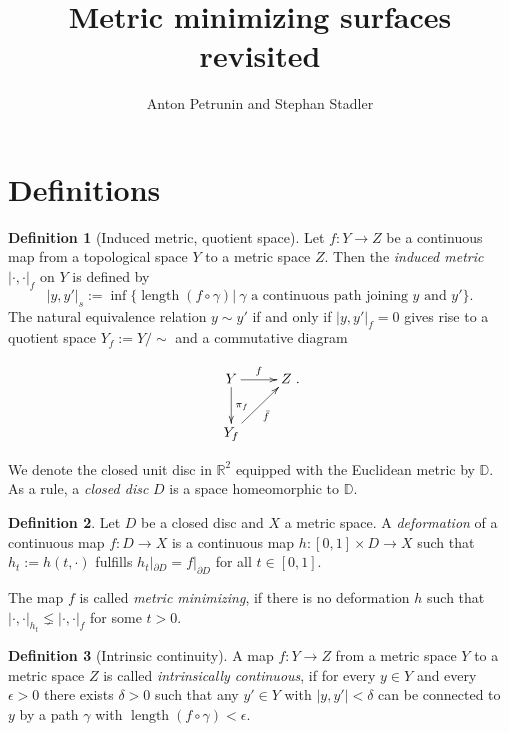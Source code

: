 \documentclass[a4paper,12pt]{article}
\theoremstyle{remark}\newtheorem*{remark}{Remark}
\theoremstyle{definition}\newtheorem{definition}{Definition}
\newcommand{\R}{\mathbb R}
\newcommand{\DD}{\mathbb D}
\newcommand{\len}{\operatorname{length}}
\begin{document}
\title{Metric minimizing surfaces revisited}
\author{Anton Petrunin and  Stephan Stadler}
\date{}
\maketitle


\section{Definitions}



\begin{definition}[Induced metric, quotient space]
Let $f:Y\rightarrow Z$ be a continuous map from a topological 
space $Y$ to a metric space $Z$. Then the {\em induced metric}
$|\cdot,\cdot|_f$
on $Y$ is defined by
$$
|y,y'|_s:=\inf\{\len(f\circ\gamma)|\ 
\gamma \text{ a continuous path joining } y\text{ and }y'\}.
$$ 
The natural equivalence relation $y\sim y'$ if and only if 
$|y,y'|_f=0$ gives rise to a quotient space $Y_f:=Y/\sim$ and a
commutative diagram

\begin{displaymath}
    \xymatrix{ Y \ar[r]^f\ar[d]^{\pi_f} & Z  \\
               Y_f \ar[ru]_{\bar f} }.
\end{displaymath}


\end{definition}

We denote the closed unit disc in $\R^2$ equipped with the 
Euclidean metric by $\DD$.
As a rule, a {\em closed disc} $D$ is a space homeomorphic
to $\DD$. 

\begin{definition}
Let $D$ be a closed disc and $X$ a metric space. 
A {\em deformation} of a continuous map $f:D\rightarrow X$ is 
a continuous map $h:[0,1]\times D\rightarrow X$ such that 
$h_t:=h(t,\cdot)$ fulfills $h_t|_{\partial D}=f|_{\partial D}$ 
for all $t\in[0,1]$. 

The map $f$ is called {\em metric minimizing}, 
if there is no deformation $h$ such that 
$|\cdot,\cdot|_{h_t}\lneq|\cdot,\cdot|_f$ for some $t>0$.
\end{definition}




\begin{definition}[Intrinsic continuity]
A map $f:Y\to Z$ from a metric space $Y$ to a metric space
 $Z$ is called
{\em intrinsically continuous}, if for every $y\in Y$ 
and every $\epsilon>0$ there
exists $\delta>0$ such that any  $y'\in Y$
with $|y,y'|<\delta$ can be connected to $y$ by a path $\gamma$ 
with $\len(f\circ\gamma)<\epsilon$.
\end{definition}
\end{document}
